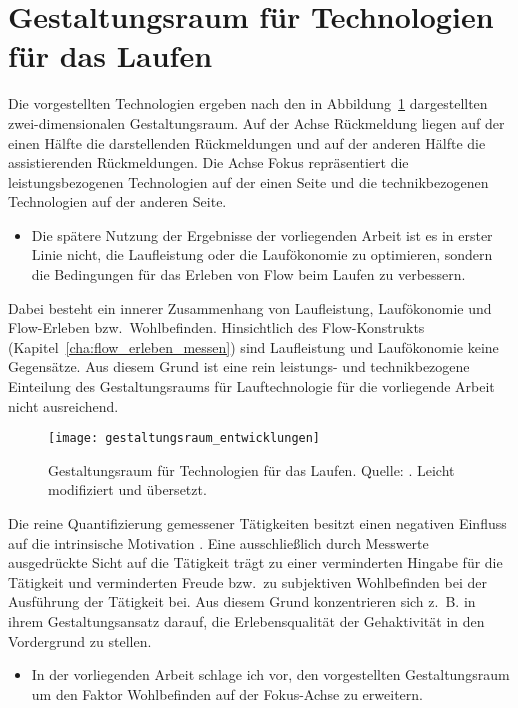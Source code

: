 

\section{Gestaltungsraum für Technologien für das Laufen} 

\label{sec:gestaltungsraum_fur_technologien_fur_das_laufen}

Die vorgestellten Technologien ergeben nach \citet{Jensen2014} den in Abbildung~\ref{fig:gestaltungsraum_entwicklungen} dargestellten zwei-dimensionalen Gestaltungsraum. Auf der Achse Rückmeldung liegen auf der einen Hälfte die darstellenden Rückmeldungen und auf der anderen Hälfte die assistierenden Rückmeldungen. Die Achse Fokus repräsentiert die leistungsbezogenen Technologien auf der einen Seite und die technikbezogenen Technologien auf der anderen Seite. 
\begin{itemize}
	
	\item Die spätere Nutzung der Ergebnisse der vorliegenden Arbeit ist es in erster Linie nicht, die Laufleistung oder die Laufökonomie zu optimieren, sondern die Bedingungen für das Erleben von Flow beim Laufen zu verbessern. 
\end{itemize}

Dabei besteht ein innerer Zusammenhang von Laufleistung, Laufökonomie und Flow-Erleben bzw.\ Wohlbefinden. Hinsichtlich des Flow-Konstrukts (Kapitel~\ref{cha:flow_erleben_messen}) sind Laufleistung und Laufökonomie keine Gegensätze. Aus diesem Grund ist eine rein leistungs- und technikbezogene Einteilung des Gestaltungsraums für Lauftechnologie für die vorliegende Arbeit nicht ausreichend. 
\begin{figure}
	[!htb] \centering 
	\texttt{[image: gestaltungsraum\_entwicklungen]} \caption[Gestaltungsraum für Technologien für das Laufen]{Gestaltungsraum für Technologien für das Laufen. Quelle: \citet{Jensen2014}. Leicht modifiziert und übersetzt.}\label{fig:gestaltungsraum_entwicklungen} 
\end{figure}

Die reine Quantifizierung gemessener Tätigkeiten besitzt einen negativen Einfluss auf die intrinsische Motivation \citep{Etkin2016}. Eine ausschließlich durch Messwerte ausgedrückte Sicht auf die Tätigkeit trägt zu einer verminderten Hingabe für die Tätigkeit und verminderten Freude bzw.\ zu subjektiven Wohlbefinden bei der Ausführung der Tätigkeit bei. Aus diesem Grund konzentrieren sich z.~B. \citet{Hajinejad2015} in ihrem Gestaltungsansatz darauf, die Erlebensqualität der Gehaktivität in den Vordergrund zu stellen. 
\begin{itemize}
	
	\item In der vorliegenden Arbeit schlage ich vor, den vorgestellten Gestaltungsraum um den Faktor Wohlbefinden auf der Fokus-Achse zu erweitern. 
\end{itemize}


